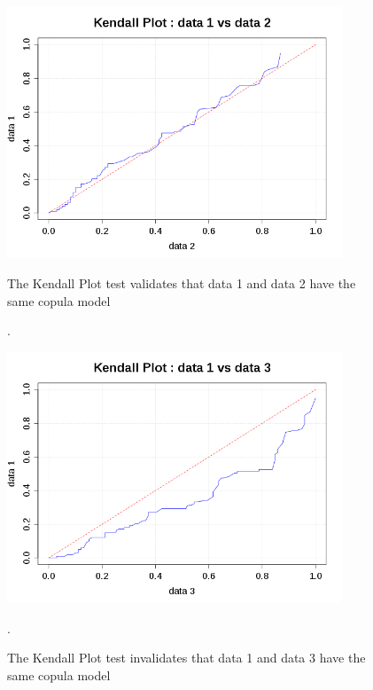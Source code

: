 \begin{figure}[H]
  \begin{minipage}{10cm}
    \begin{center}
      \includegraphics[width=10cm]{KendallPlotSample.png}
    \end{center}
    \caption{The Kendall Plot test validates that data 1 and data 2 have the same copula model}.
    \label{SameCop}
  \end{minipage}
  \hfill
  \begin{minipage}{10cm}
    \begin{center}
      \includegraphics[width=10cm]{KendallPlotSampleBad.png}
    \end{center}
    \caption{The Kendall Plot test invalidates that data 1 and data 3 have the same copula model}.
    \label{DifCop}
  \end{minipage}
\end{figure}

